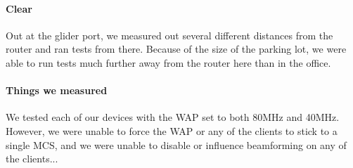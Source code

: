 \paragraph{Clear}
Out at the glider port, we measured out several different distances from the
router and ran tests from there. Because of the size of the parking lot, we were
able to run tests much further away from the router here than in the office.

\paragraph{  Things we measured }
We tested each of our devices with the WAP set to both 80MHz and 40MHz.
However, we were unable to force the WAP or any of the clients to stick to a
single MCS, and we were unable to disable or influence beamforming on any of the
clients...



